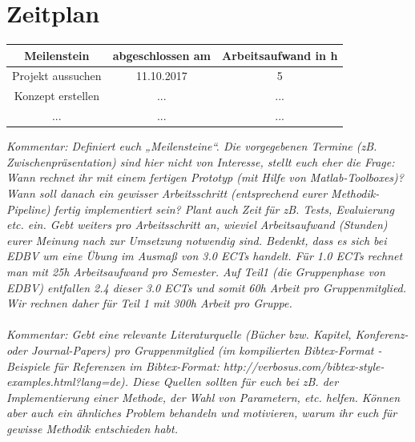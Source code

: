 \documentclass[deutsch]{scrartcl}
\begin{document}
\section{Zeitplan}
\begin{table}[h!]
	\centering
		\begin{tabular}{|c|c|c|}
		\hline
		Meilenstein & abgeschlossen am & Arbeitsaufwand in h\\
		\hline
		Projekt aussuchen& 11.10.2017 & 5\\
		Konzept erstellen& ... & ...\\
		... & ... & ... \\
		\hline
		\end{tabular}
\end{table}
\textit{Kommentar: Definiert euch „Meilensteine“. Die vorgegebenen Termine (zB. Zwischenpräsentation) sind hier nicht von Interesse, stellt euch eher die Frage: Wann rechnet ihr mit einem fertigen Prototyp (mit Hilfe von Matlab-Toolboxes)? Wann soll danach ein gewisser Arbeitsschritt (entsprechend eurer Methodik-Pipeline) fertig implementiert sein? Plant auch Zeit für zB. Tests, Evaluierung etc. ein.
Gebt weiters pro Arbeitsschritt an, wieviel Arbeitsaufwand (Stunden) eurer Meinung nach zur Umsetzung notwendig sind. Bedenkt, dass es sich bei EDBV um eine Übung im Ausmaß von 3.0 ECTs handelt. Für 1.0 ECTs rechnet man mit 25h Arbeitsaufwand pro Semester. Auf Teil1 (die Gruppenphase von EDBV) entfallen 2.4 dieser 3.0 ECTs und somit 60h Arbeit pro Gruppenmitglied. Wir rechnen daher für Teil 1 mit 300h Arbeit pro Gruppe.
}\\
\\
\textit{Kommentar: Gebt eine relevante Literaturquelle (Bücher bzw. Kapitel, Konferenz- oder Journal-Papers) pro Gruppenmitglied (im kompilierten Bibtex-Format - Beispiele für Referenzen im Bibtex-Format: http://verbosus.com/bibtex-style-examples.html?lang=de). Diese Quellen sollten für euch bei zB. der Implementierung einer Methode, der Wahl von Parametern, etc. helfen. Können aber auch ein ähnliches Problem behandeln und motivieren, warum ihr euch für gewisse Methodik entschieden habt.}

\nocite{*}

\end{document}
